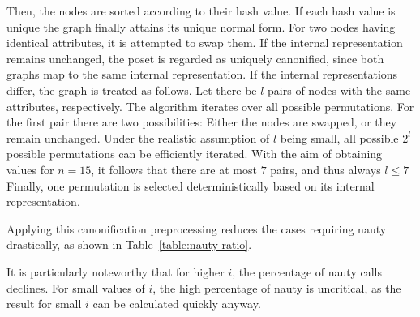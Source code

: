 \documentclass[10pt,journal,compsoc]{IEEEtran}
\begin{document}
Then, the nodes are sorted according to their hash value.
If each hash value is unique the graph finally attains its unique normal form.
For two nodes having identical attributes, it is attempted to swap them.
If the internal representation remains unchanged, the poset is regarded as uniquely canonified, since both graphs map to the same internal representation.
If the internal representations differ, the graph is treated as follows.
Let there be $l$ pairs of nodes with the same attributes, respectively.
The algorithm iterates over all possible permutations.
For the first pair there are two possibilities: Either the nodes are swapped, or they remain unchanged.
Under the realistic assumption of $l$ being small, all possible $2^l$ possible permutations can be efficiently iterated.
With the aim of obtaining values for $n = 15$, it follows that there are at most $7$ pairs, and thus always $l \leq 7$
Finally, one permutation is selected deterministically based on its internal representation.

Applying this canonification preprocessing reduces the cases requiring nauty drastically, as shown in Table~\ref{table:nauty-ratio}.

\begin{table}[!t]
  \renewcommand{\arraystretch}{1.2}
  \caption{Percentage in which nauty was required for canonification for variable $n$ and $i$, lower is better}
  \label{table:nauty-ratio}
  \centering
\end{table}

It is particularly noteworthy that for higher $i$, the percentage of nauty calls declines.
For small values of $i$, the high percentage of nauty is uncritical, as the result for small $i$ can be calculated quickly anyway.
\end{document}
